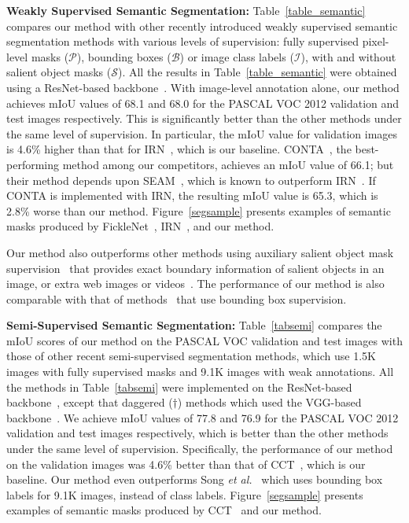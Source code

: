 \documentclass[final]{cvpr}
\begin{document}
{\textbf{Weakly Supervised Semantic Segmentation:}} Table~\ref{table_semantic} compares our method with other recently introduced weakly supervised semantic segmentation methods with various levels of supervision: fully supervised pixel-level masks ($\mathcal{P}$), bounding boxes ($\mathcal{B}$) or image class labels ($\mathcal{I}$), with and without salient object masks ($\mathcal{S}$). All the results in Table~\ref{table_semantic} were obtained using a ResNet-based backbone~\cite{he2016deep}.
With image-level annotation alone, our method achieves mIoU values of 68.1 and 68.0 for the PASCAL VOC 2012 validation and test images respectively. This is significantly better than the other methods under the same level of supervision. In particular, the mIoU value for validation images is 4.6\% higher than that for IRN~\cite{ahn2019weakly}, which is our baseline.
CONTA~\cite{zhang2020causal}, the best-performing method among our competitors, achieves an mIoU value of 66.1; but their method depends upon SEAM~\cite{wang2020self}, which is known to outperform IRN~\cite{ahn2019weakly}. If CONTA is implemented with IRN, the resulting mIoU value is 65.3, which is 2.8\% worse than our method. Figure~\ref{segsample} presents examples of semantic masks produced by FickleNet~\cite{lee2019ficklenet}, IRN~\cite{ahn2019weakly}, and our method.


Our method also outperforms other methods using auxiliary salient object mask supervision~\cite{li2014secrets, liu2010learning} that provides exact boundary information of salient objects in an image, or extra web images or videos~\cite{sun2020mining, lee2019frame}.
The performance of our method is also comparable with that of methods~\cite{song2019box, khoreva2017simple} that use bounding box supervision.



{\textbf{Semi-Supervised Semantic Segmentation:}} 
Table~\ref{tabsemi} compares the mIoU scores of our method on the PASCAL VOC validation and test images with those of other recent semi-supervised segmentation methods, which use 1.5K images with fully supervised masks and 9.1K images with weak annotations.
All the methods in Table~\ref{tabsemi} were implemented on the ResNet-based backbone~\cite{he2016deep}, except that daggered ($\dagger$) methods which used the VGG-based backbone~\cite{simonyan2014very}.
We achieve mIoU values of 77.8 and 76.9 for the PASCAL VOC 2012 validation and test images respectively, which is better than the other methods under the same level of supervision. 
Specifically, the performance of our method on the validation images was 4.6\% better than that of CCT~\cite{ouali2020semi}, which is our baseline. Our method even outperforms Song \textit{et al.}~\cite{song2019box} which uses bounding box labels for 9.1K images, instead of class labels.
Figure~\ref{segsample} presents examples of semantic masks produced by CCT~\cite{ouali2020semi} and our method.
\end{document}
